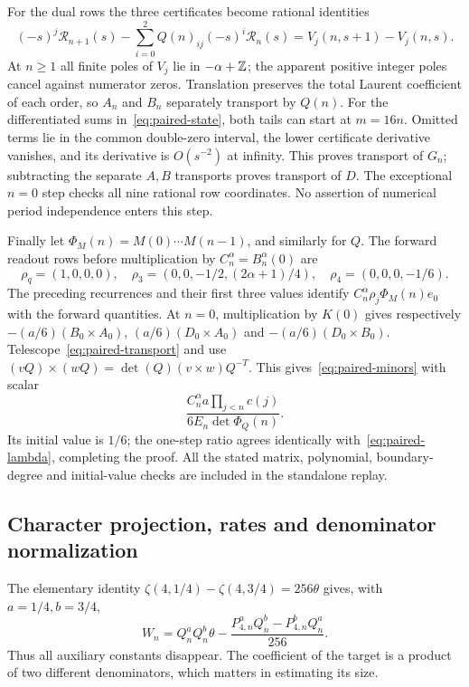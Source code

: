 For the dual rows the three certificates become rational identities
\[
 (-s)^j\mathcal R_{n+1}(s)
 -\sum_{i=0}^2Q(n)_{ij}(-s)^i\mathcal R_n(s)
                           =V_j(n,s+1)-V_j(n,s).
\]
At $n\geq1$ all finite poles of $V_j$ lie in $-\alpha+\mathbb Z$;
the apparent positive integer poles cancel against numerator zeros.
Translation preserves the total Laurent coefficient of each order,
so $A_n$ and $B_n$ separately transport by $Q(n)$.
For the differentiated sums in~\eqref{eq:paired-state}, both tails
can start at $m=16n$. Omitted terms lie in the common double-zero
interval, the lower certificate derivative vanishes, and its derivative
is $O(s^{-2})$ at infinity. This proves transport of $G_n$;
subtracting the separate $A,B$ transports proves transport of $D$.
The exceptional $n=0$ step checks all nine rational row coordinates.
No assertion of numerical period independence enters this step.

Finally let $\Phi_M(n)=M(0)\cdots M(n-1)$, and similarly for $Q$.
The forward readout rows before multiplication by
$C_n^\alpha=B_n^\alpha(0)$ are
\[
 \rho_q=(1,0,0,0),\quad
 \rho_3=(0,0,-1/2,(2\alpha+1)/4),\quad
 \rho_4=(0,0,0,-1/6).
\]
The preceding recurrences and their first three values identify
$C_n^\alpha\rho_j\Phi_M(n)e_0$ with the forward quantities.
At $n=0$, multiplication by $K(0)$ gives respectively
$-(a/6)(B_0\times A_0)$, $(a/6)(D_0\times A_0)$ and
$-(a/6)(D_0\times B_0)$. Telescope~\eqref{eq:paired-transport}
and use $(vQ)\times(wQ)=\det(Q)(v\times w)Q^{-T}$.
This gives~\eqref{eq:paired-minors} with scalar
\[
 \frac{C_n^\alpha a\prod_{j<n}c(j)}{6E_n\det\Phi_Q(n)}.
\]
Its initial value is $1/6$; the one-step ratio agrees identically
with~\eqref{eq:paired-lambda}, completing the proof. All the stated
matrix, polynomial, boundary-degree and initial-value checks are included
in the standalone replay.

\subsection{Character projection, rates and denominator normalization}
The elementary identity
$\zeta(4,1/4)-\zeta(4,3/4)=256\theta$ gives, with $a=1/4,b=3/4$,
\begin{equation}\label{eq:paired-W}
 W_n=Q_n^aQ_n^b\theta
       -\frac{P_{4,n}^aQ_n^b-P_{4,n}^bQ_n^a}{256}.
\end{equation}
Thus all auxiliary constants disappear. The coefficient of the target
is a product of two different denominators, which matters in estimating
its size.

